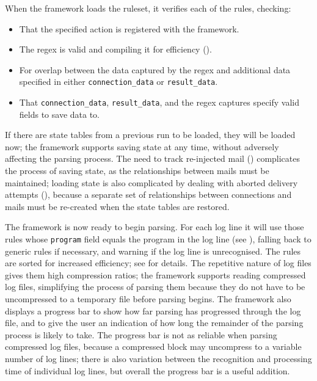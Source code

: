 When the framework loads the ruleset, it verifies each of the rules,
checking:

\begin{itemize}

    \squeezeitems{}

    \item That the specified action is registered with the framework.

    \item The regex is valid and compiling it for efficiency
        ().

    \item For overlap between the data captured by the regex and additional
        data specified in either \texttt{connection\_data} or
        \texttt{result\_data}.

    \item That \texttt{connection\_data}, \texttt{result\_data}, and the
        regex captures specify valid fields to save data to.

\end{itemize}

If there are state tables from a previous \parsername{} run to be loaded,
they will be loaded now; the framework supports saving state at any time,
without adversely affecting the parsing process.  The need to track
re-injected mail () complicates the process
of saving state, as the relationships between mails must be maintained;
loading state is also complicated by dealing with aborted delivery attempts
(), because a separate set of
relationships between connections and mails must be re-created when the
state tables are restored.

The framework is now ready to begin parsing.  For each log line it will use
those rules whose \texttt{program} field equals the program in the log line
(see ), falling back to
generic rules if necessary, and warning if the log line is unrecognised.
The rules are sorted for increased efficiency; see  for details.  The repetitive nature of log files
gives them high compression ratios; the framework supports reading
compressed log files, simplifying the process of parsing them because they
do not have to be uncompressed to a temporary file before parsing begins.
The framework also displays a progress bar to show how far parsing has
progressed through the log file, and to give the user an indication of how
long the remainder of the parsing process is likely to take.  The progress
bar is not as reliable when parsing compressed log files, because a
compressed block may uncompress to a variable number of log lines; there is
also variation between the recognition and processing time of individual
log lines, but overall the progress bar is a useful addition.


